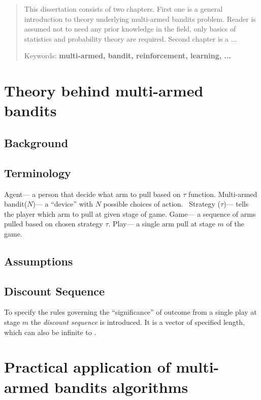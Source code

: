 \documentclass[11pt, a4paper]{report}
\begin{document}
\begin{abstract}
This dissertation consists of two chapters. First one is a general introduction to theory underlying multi-armed bandits problem. Reader is assumed not to need any prior knowledge in the field, only basics of statistics and probability theory are required. Second chapter is a ...
\begin{center}
Keywords: \textbf{multi-armed, bandit, reinforcement, learning, ...}
\end{center}
\end{abstract}
\newpage
\tableofcontents
\newpage

\chapter{Theory behind multi-armed bandits}

\section{Background}

\section{Terminology}
Agent--- a person that decide what arm to pull based on $\tau$ function.
Multi-armed bandit($N$)--- a ``device'' with $N$ possible choices of action.~\cite{berry+firstedt}
Strategy ($\tau$)--- tells the player which arm to pull at given stage of game.
Game--- a sequence of arms pulled based on chosen strategy $\tau$.
Play--- a single arm pull at stage $m$ of the game.

\section{Assumptions}
\lipsum[1]

\section{Discount Sequence}
To specify the rules governing the ``significance'' of outcome from a single play at stage $m$ the \emph{discount sequence} is introduced. It is a vector of specified length, which can also be infinite to .






\chapter{Practical application of multi-armed bandits algorithms}

{}

\end{document}
